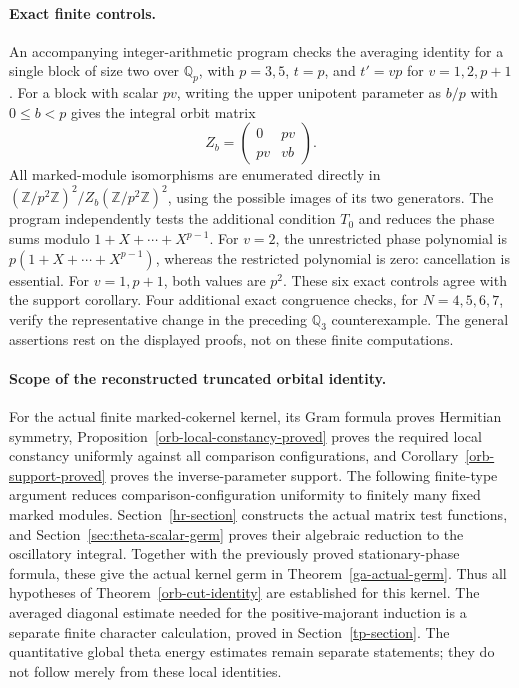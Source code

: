 \paragraph{Exact finite controls.}
An accompanying integer-arithmetic program checks the averaging
identity for a single block of size two over $\mathbb Q_p$,
with $p=3,5$, $t=p$, and $t'=vp$ for $v=1,2,p+1$.
For a block with scalar $pv$, writing the upper unipotent
parameter as $b/p$ with $0\le b<p$ gives the integral orbit matrix
\[
 Z_b=\begin{pmatrix}0&pv\\pv&vb\end{pmatrix}.
\]
All marked-module isomorphisms are enumerated directly in
$(\mathbb Z/p^2\mathbb Z)^2/Z_b(\mathbb Z/p^2\mathbb Z)^2$,
using the possible images of its two generators.  The program
independently tests the additional condition $T_0$ and reduces
the phase sums modulo $1+X+\cdots+X^{p-1}$.
For $v=2$, the unrestricted phase polynomial is
$p(1+X+\cdots+X^{p-1})$, whereas the restricted polynomial is
zero: cancellation is essential.  For $v=1,p+1$, both values
are $p^2$.  These six exact controls agree with the support
corollary.  Four additional exact congruence checks, for
$N=4,5,6,7$, verify the representative change in the preceding
$\mathbb Q_3$ counterexample.  The general assertions rest on
the displayed proofs, not on these finite computations.

\paragraph{Scope of the reconstructed truncated orbital identity.}
For the actual finite marked-cokernel kernel, its Gram formula
proves Hermitian symmetry, Proposition~\ref{orb-local-constancy-proved}
proves the required local constancy uniformly against all comparison
configurations, and Corollary~\ref{orb-support-proved} proves the
inverse-parameter support.  The following finite-type argument
reduces comparison-configuration uniformity to finitely many
fixed marked modules.  Section~\ref{hr-section} constructs the
actual matrix test functions, and
Section~\ref{sec:theta-scalar-germ} proves their algebraic
reduction to the oscillatory integral.  Together with the previously
proved stationary-phase formula, these give the actual kernel germ
in Theorem~\ref{ga-actual-germ}.  Thus all hypotheses of
Theorem~\ref{orb-cut-identity} are established for this kernel.
The averaged diagonal estimate needed for the positive-majorant
induction is a separate finite character calculation, proved in
Section~\ref{tp-section}.  The quantitative global theta energy
estimates remain separate statements; they do not follow merely
from these local identities.


